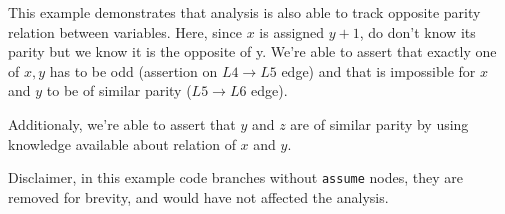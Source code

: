 This example demonstrates that analysis is also able to track opposite
parity relation between variables. Here, since $x$ is assigned $y + 1$,
do don't know its parity but we know it is the opposite of y. We're able
to assert that exactly one of $x,y$ has to be odd (assertion on
$L4\rightarrow L5$ edge) and that is impossible for $x$ and $y$ to be of
similar parity ($L5\rightarrow L6$ edge).

Additionaly, we're able to assert that $y$ and $z$ are of similar parity
by using knowledge available about relation of $x$ and $y$.

Disclaimer, in this example code branches without \texttt{assume} nodes,
they are removed for brevity, and would have not affected the analysis.
